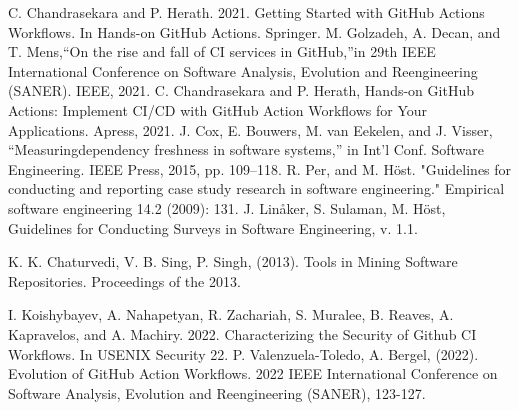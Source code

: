 \documentclass[conference]{IEEEtran}
\begin{document}
\begin{thebibliography}{00}
 C. Chandrasekara and P. Herath. 2021. Getting Started with GitHub Actions Workflows. In Hands-on GitHub Actions. Springer.
 M. Golzadeh, A. Decan, and T. Mens,“On the rise and fall of CI services in GitHub,”in 29th IEEE International Conference on Software Analysis, Evolution and Reengineering (SANER). IEEE, 2021.
 C. Chandrasekara and P. Herath, Hands-on GitHub Actions: Implement CI/CD with GitHub Action Workflows for Your Applications. Apress, 2021.
 J. Cox, E. Bouwers, M. van Eekelen, and J. Visser, “Measuringdependency freshness in software systems,” in Int’l Conf. Software Engineering. IEEE Press, 2015, pp. 109–118.
 R. Per, and M. Höst. "Guidelines for conducting and reporting case study research in software engineering." Empirical software engineering 14.2 (2009): 131.
 J. Linåker, S. Sulaman, M. Höst, Guidelines for Conducting Surveys in Software Engineering, v. 1.1.

 K. K. Chaturvedi, V. B. Sing, P. Singh, (2013). Tools in Mining Software Repositories. Proceedings of the 2013. 

 I. Koishybayev, A. Nahapetyan, R. Zachariah, S. Muralee, B. Reaves, A. Kapravelos, and A. Machiry. 2022. Characterizing the Security of Github CI Workflows. In USENIX Security 22. 
 P. Valenzuela-Toledo, A. Bergel, (2022). Evolution of GitHub Action Workflows. 2022 IEEE International Conference on Software Analysis, Evolution and Reengineering (SANER), 123-127.

\end{thebibliography}
\vspace{12pt}
\end{document}

